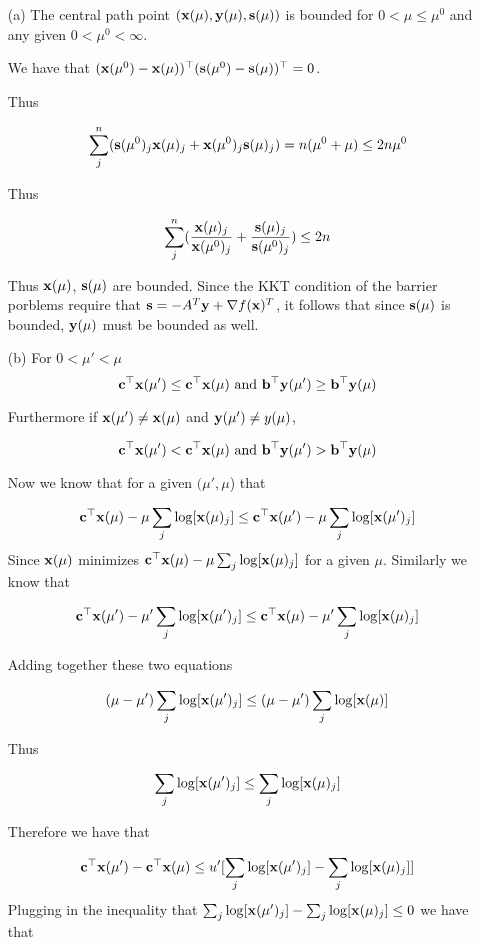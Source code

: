 \documentclass{article} %
\renewcommand\b{{\bf b}}
\newcommand\x{{\bf x}}
\newcommand\cc{{\bf c}}
\renewcommand\b{{\bf b}}
\newcommand\y{{\bf y}}
\newcommand\s{{\bf s}}
\begin{document}
\begin{itemize}
\item[(a)] The central path point $(\x(\mu), \y(\mu), \s(\mu))$ is bounded for $0 < \mu \leq \mu^{0}$ and any given $0 < \mu^{0} < \infty$. 


We have that $(\x(\mu^{0}) - \x(\mu))^{\top} ( \s(\mu^{0})  - \s(\mu))^{\top} = 0$.
 
Thus

\[
\sum_{j}^{n} (\s(\mu^{0})_j \x(\mu)_j  + \x(\mu^{0})_j \s(\mu)_j ) = n(\mu^0 + \mu) \leq 2 n \mu^{0}
\]

Thus 

\[
\sum_{j}^{n} ( \frac{ \x(\mu)_j}{\x(\mu^{0})_j} + \frac{\s(\mu)_j}{\s(\mu^0)_j}) \leq 2n
\]

Thus $\x(\mu)$, $\s(\mu)$ are bounded. Since the KKT condition of the barrier porblems require that $\s = -A^{T}\y + \nabla f(\x)^{T}$, it follows that since $\s(\mu)$ is bounded, $\y(\mu)$ must be bounded as well.


\item[(b)] For $ 0 < \mu' < \mu$ 
\[
\cc^{\top} \x(\mu') \leq \cc^{\top} \x(\mu) \mbox{  and } \b^{\top} \y(\mu') \geq \b^{\top} \y(\mu)
\]

Furthermore if $\x(\mu') \neq  \x(\mu)$ and $\y(\mu') \neq y(\mu)$,

\[
\cc^{\top} \x(\mu') < \cc^{\top} \x(\mu) \mbox{  and } \b^{\top} \y(\mu') > \b^{\top} \y(\mu)
\]


Now we know that for a given $(\mu', \mu$) that 


\[
\cc^{\top} \x(\mu) - \mu \sum_{j} \log[\x(\mu)_j] \leq \cc^{\top} \x(\mu') - \mu \sum_{j} \log[\x(\mu')_j] 
\]
Since $\x(\mu)$ minimizes $\cc^{\top} \x(\mu) - \mu \sum_{j} \log[\x(\mu)_j]$ for a given $\mu$. Similarly we know that


\[
\cc^{\top} \x(\mu') - \mu' \sum_{j} \log[\x(\mu')_j] \leq \cc^{\top} \x(\mu) - \mu' \sum_{j} \log[\x(\mu)_j] 
\]

Adding together these two equations 

\[
(\mu - \mu') \sum_{j} \log[\x(\mu')_j] \leq (\mu - \mu') \sum_{j} \log[\x(\mu)]
\]

Thus 

\[
\sum_{j} \log[\x(\mu')_j] \leq \sum_{j} \log[\x(\mu)_j]
\]

Therefore we have that 

\[
\cc^{\top} \x(\mu') - \cc^{\top} \x(\mu) \leq u'[ \sum_j \log[\x(\mu')_j] - \sum_j \log[\x(\mu)_j]]  
\]
Plugging in the inequality that $\sum_{j} \log[\x(\mu')_j] - \sum_{j} \log[\x(\mu)_j] \leq 0$ we have that 


\end{itemize}
\end{document}
